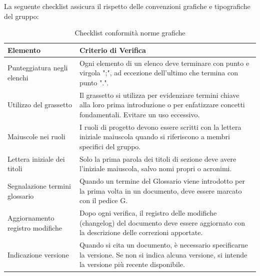 \documentclass[a4paper,11pt,oneside]{scrartcl}
\begin{document}
La seguente checklist assicura il rispetto delle convenzioni grafiche e tipografiche del gruppo:

\begin{table}[H]
    \centering
    \renewcommand{\arraystretch}{1.4}
    \begin{tabularx}{\textwidth}{@{}p{}X@{}}
        \toprule
        \textbf{Elemento}                & \textbf{Criterio di Verifica}                                                                                                                           \\
        \midrule
        Punteggiatura negli elenchi      & Ogni elemento di un elenco deve terminare con punto e virgola ";", ad eccezione dell'ultimo che termina con punto ".".                                  \\
        \midrule
        Utilizzo del grassetto           & Il grassetto si utilizza per evidenziare termini chiave alla loro prima introduzione o per enfatizzare concetti fondamentali. Evitare un uso eccessivo. \\
        \midrule
        Maiuscole nei ruoli              & I ruoli di progetto devono essere scritti con la lettera iniziale maiuscola quando si riferiscono a membri specifici del gruppo.                        \\
        \midrule
        Lettera iniziale dei titoli      & Solo la prima parola dei titoli di sezione deve avere l'iniziale maiuscola, salvo nomi propri o acronimi.                                               \\
        \midrule
        Segnalazione termini glossario   & Quando un termine del Glossario viene introdotto per la prima volta in un documento, deve essere marcato con il pedice G.                               \\
        \midrule
        Aggiornamento registro modifiche & Dopo ogni verifica, il registro delle modifiche (changelog) del documento deve essere aggiornato con la descrizione delle correzioni apportate.         \\
        \midrule
        Indicazione versione             & Quando si cita un documento, è necessario specificarne la versione. Se non si indica alcuna versione, si intende la versione più recente disponibile.   \\
        \bottomrule
    \end{tabularx}
    \caption{Checklist conformità norme grafiche}
\end{table}
\end{document}
